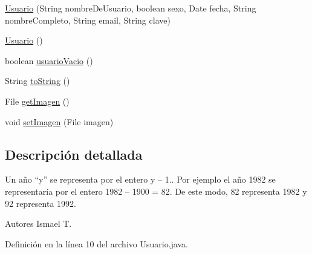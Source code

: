 \begin{DoxyCompactItemize}
\item 
\hyperlink{classcom_1_1ucab_1_1javachat_1_1_cliente_1_1model_1_1_usuario_af5dfba7bb9e4c89c8627cd630e80493d}{Usuario} (String nombre\-De\-Usuario, boolean sexo, Date fecha, String nombre\-Completo, String email, String clave)
\item 
\hyperlink{classcom_1_1ucab_1_1javachat_1_1_cliente_1_1model_1_1_usuario_a6fb41544b1d07d60be132042555ac999}{Usuario} ()
\item 
boolean \hyperlink{classcom_1_1ucab_1_1javachat_1_1_cliente_1_1model_1_1_usuario_a451d92b5925acf1f2f890e4986c5f96a}{usuario\-Vacio} ()
\item 
String \hyperlink{classcom_1_1ucab_1_1javachat_1_1_cliente_1_1model_1_1_usuario_aa7602a327f0e4c69c61b8e650789ff97}{to\-String} ()
\item 
File \hyperlink{classcom_1_1ucab_1_1javachat_1_1_cliente_1_1model_1_1_usuario_a6076d2bdaaa7f2b04b03fc18ff0bc114}{get\-Imagen} ()
\item 
void \hyperlink{classcom_1_1ucab_1_1javachat_1_1_cliente_1_1model_1_1_usuario_a5c739c484c0d22ea8255818d200785fd}{set\-Imagen} (File imagen)
\end{DoxyCompactItemize}


\subsection{Descripción detallada}
Un año “y” se representa por el entero y – 1.. Por ejemplo el año 1982 se representaría por el entero 1982 – 1900 = 82. De este modo, 82 representa 1982 y 92 representa 1992. \begin{DoxyAuthor}{Autores}
Ismael T. 
\end{DoxyAuthor}


Definición en la línea 10 del archivo Usuario.\-java.



